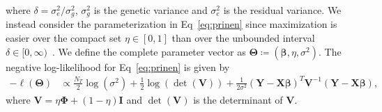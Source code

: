 \documentclass[10pt,letterpaper]{article}
\newcommand{\bX}{\textbf{X}}
\newcommand{\bY}{\textbf{Y}}
\newcommand{\bV}{\textbf{V}}
\newcommand{\bI}{\textbf{I}}
\newcommand{\bTheta}{\boldsymbol{\Theta}}
\newcommand{\bbeta}{\boldsymbol{\beta}}
\newcommand{\bPhi}{\boldsymbol{\Phi}}
\begin{document}
where $\delta = \sigma^2_e / \sigma^2_g$, $\sigma^2_g$ is the genetic variance and $\sigma^2_e$ is the residual variance. We instead consider the parameterization in Eq~\ref{eq:prinen} since maximization is easier over the compact set $\eta \in [0,1]$ than over the unbounded interval $\delta \in [0, \infty)$~\cite{pirinen2013efficient}. We define the complete parameter vector as $\bTheta \coloneqq \left(\bbeta, \eta, \sigma^2 \right)$. The negative log-likelihood for Eq~\ref{eq:prinen} is given by
\begin{align}
-\ell(\bTheta) & \propto \frac{N_T}{2}\log(\sigma^2) + \frac{1}{2}\log\left(\det(\bV)\right) + \frac{1}{2\sigma^2} \left(\bY - \bX \bbeta\right)^T \bV^{-1} \left(\bY - \bX \bbeta\right)  \label{eq:LogLike},
\end{align}
where $\bV = \eta \bPhi + (1-\eta) \bI$ and $\det(\bV)$ is the determinant of $\bV$.
\end{document}
